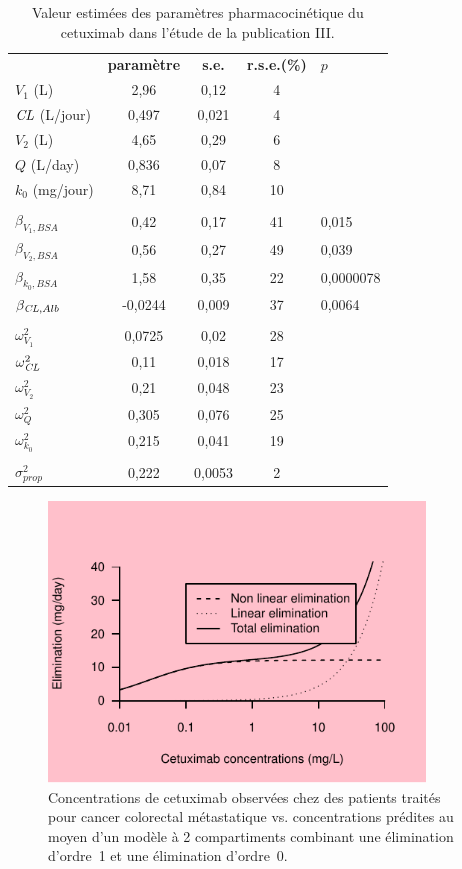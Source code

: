 \begin{table}[!ht]
  \centering
  \caption{Valeur estimées des paramètres pharmacocinétique du cetuximab dans l'étude de la publication III.}
    \begin{tabular}{lcccl}
       &  &  &  &  \\
      \hline
      \textbf{} & \textbf{paramètre} & \textbf{s.e.} & \textbf{r.s.e.(\%)} & $p$ \\
      \hline
      \hline
      $V_1$ (L) & 2,96 & 0,12 & 4 &  \\
      $\operatorname{\textit{CL}}$ (L/jour) & 0,497 & 0,021 & 4 &  \\
      $V_2$ (L) & 4,65 & 0,29 & 6 &  \\
      $Q$ (L/day) & 0,836 & 0,07 & 8 &  \\
      $k_0$ (mg/jour) & 8,71 & 0,84 & 10 &  \\
       &  &  &  &  \\
      $\beta_{V_1,BSA}$ & 0,42 & 0,17 & 41 & 0,015 \\
      $\beta_{V_2,BSA}$ & 0,56 & 0,27 & 49 & 0,039 \\
      $\beta_{k_0,BSA}$ & 1,58 & 0,35 & 22 & 0,0000078 \\
      $\beta_{\operatorname{\textit{CL}},Alb}$  & -0,0244 & 0,009 & 37 & 0,0064 \\
       &  &  &  &  \\
      $\omega^2_{V_1}$ & 0,0725 & 0,02 & 28 &  \\
      $\omega^2_{\operatorname{\textit{CL}}}$ & 0,11 & 0,018 & 17 &  \\
      $\omega^2_{V_2}$ & 0,21 & 0,048 & 23 &  \\
      $\omega^2_{Q}$ & 0,305 & 0,076 & 25 &  \\
      $\omega^2_{k_0}$ & 0,215 & 0,041 & 19 &  \\
       &  &  &  &  \\
      $\sigma^2_{prop}$ & 0,222 & 0,0053 & 2 &  \\
      \hline
    \end{tabular}
  \label{tab:3}
\end{table}
 
\begin{figure}[htbp]
	\centering
		\includegraphics[width=10cm]{images/essai001.pdf}
	\caption{Concentrations de cetuximab observées chez des patients traités pour cancer colorectal métastatique vs. concentrations prédites au moyen d'un modèle à 2 compartiments combinant une élimination d'ordre~1 et une élimination d'ordre~0.}
	\label{fig:20}
\end{figure}

